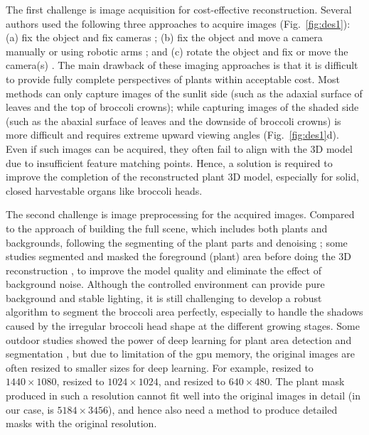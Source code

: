 

The first challenge is image acquisition for cost-effective reconstruction. Several authors used the following three approaches to acquire images (Fig.~\ref{fig:des1}): (a) fix the object and fix cameras \citep{nguyen_structured_2015}; (b) fix the object and move a camera manually \citep{xiao_image-based_2020} or using robotic arms \citep{cao_quantifying_2019,nguyen_3d_2016}; and (c) rotate the object and fix or move the camera(s) \citep{kochi_3d_2018,gao_novel_2021}. The main drawback of these imaging approaches is that it is difficult to provide fully complete perspectives of plants within acceptable cost. Most methods can only capture images of the sunlit side (such as the adaxial surface of leaves and the top of broccoli crowns); while capturing images of the shaded side (such as the abaxial surface of leaves and the downside of broccoli crowns) is more difficult and requires extreme upward viewing angles (Fig.~\ref{fig:des1}d). Even if such images can be acquired, they often fail to align with the 3D model due to insufficient feature matching points. Hence, a solution is required to improve the completion of the reconstructed plant 3D model, especially for solid, closed harvestable organs like broccoli heads.

The second challenge is image preprocessing for the acquired images. Compared to the approach of building the full scene, which includes both plants and backgrounds, following the segmenting of the plant parts \citep{ge_method_2019} and denoising \citep{wu_mvs-pheno_2020}; some studies segmented and masked the foreground (plant) area before doing the 3D reconstruction \citep{nguyen_3d_2016,kochi_3d_2018}, to improve the model quality and eliminate the effect of background noise. Although the controlled environment can provide pure background and stable lighting, it is still challenging to develop a robust algorithm to segment the broccoli area perfectly, especially to handle the shadows caused by the irregular broccoli head shape at the different growing stages. Some outdoor studies showed the power of deep learning for plant area detection and segmentation \citep{zhou_monitoring_2020,blok_effect_2021,garcia_towards_2021}, but due to limitation of the \gls{gpu} memory, the original images are often resized to smaller sizes for deep learning. For example, \citet{zhou_monitoring_2020} resized to $1440 \times 1080$, \citet{blok_effect_2021} resized to $1024 \times 1024$, and \citet{garcia_towards_2021} resized to $640 \times 480$. The plant mask produced in such a resolution cannot fit well into the original images in detail (in our case, is $5184 \times 3456$), and hence also need a method to produce detailed masks with the original resolution.

